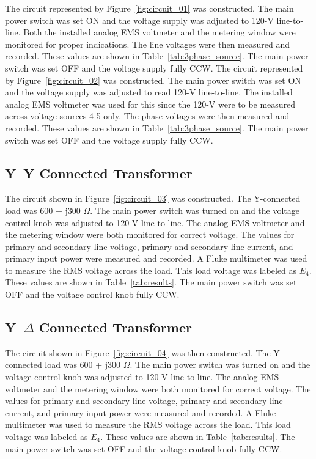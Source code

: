\documentclass{article}
\begin{document}
\label{part1} The circuit represented by Figure~\ref{fig:circuit_01} was constructed.
The main power switch was set ON and the voltage supply was adjusted to 120-V line-to-
line. Both the installed analog EMS voltmeter and the metering window were monitored
for proper indications. The line voltages were then measured and recorded. These values 
are shown in Table~\ref{tab:3phase_source}. The main power switch was set OFF and the 
voltage supply fully CCW. The circuit represented by Figure~\ref{fig:circuit_02}
was constructed. The main power switch was set ON and the voltage supply was adjusted 
to read 120-V line-to-line. The installed analog EMS voltmeter was used for this since 
the 120-V were to be measured across voltage sources 4-5 only. The phase voltages were
then measured and recorded. These values are shown in Table~\ref{tab:3phase_source}.  
The main power switch was set OFF and the voltage supply fully CCW.

\subsection{Y--Y Connected Transformer}

\label{part2} The circuit shown in Figure~\ref{fig:circuit_03} was constructed. The 
Y-connected load was 600 + j300 $\Omega$. The main power switch was turned on and the 
voltage control knob was adjusted to 120-V line-to-line. The analog EMS voltmeter and 
the metering window were both monitored for correct voltage. The values for primary and 
secondary line voltage, primary and secondary line current, and primary input power were
measured and recorded. A Fluke multimeter was used to measure the RMS voltage across the 
load. This load voltage was labeled as $E_4$. These values are shown in Table~\ref{tab:results}.  
The main power switch was set OFF and the voltage control knob fully CCW.

\subsection{Y--$\Delta$ Connected Transformer}

\label{part3} The circuit shown in Figure~\ref{fig:circuit_04} was then constructed. 
The Y-connected load was 600 + j300 $\Omega$. The main power switch was turned on and the 
voltage control knob was adjusted to 120-V line-to-line. The analog EMS voltmeter and 
the metering window were both monitored for correct voltage. The values for primary and 
secondary line voltage, primary and secondary line current, and primary input power were
measured and recorded. A Fluke multimeter was used to measure the RMS voltage across the 
load. This load voltage was labeled as $E_4$. These values are shown in Table~\ref{tab:results}.  
The main power switch was set OFF and the voltage control knob fully CCW.
\end{document}
